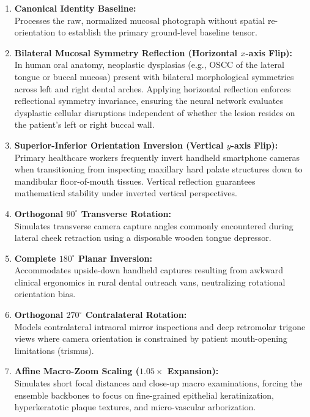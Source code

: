 \documentclass[12pt,a4paper,oneside]{report}
\begin{document}
\begin{enumerate}[label=\textbf{Pass \arabic*:}, leftmargin=*]
    \item \textbf{Canonical Identity Baseline:} \\
    Processes the raw, normalized mucosal photograph without spatial re-orientation to establish the primary ground-level baseline tensor.
    
    \item \textbf{Bilateral Mucosal Symmetry Reflection (Horizontal $x$-axis Flip):} \\
    In human oral anatomy, neoplastic dysplasias (e.g., OSCC of the lateral tongue or buccal mucosa) present with bilateral morphological symmetries across left and right dental arches. Applying horizontal reflection enforces reflectional symmetry invariance, ensuring the neural network evaluates dysplastic cellular disruptions independent of whether the lesion resides on the patient's left or right buccal wall.
    
    \item \textbf{Superior-Inferior Orientation Inversion (Vertical $y$-axis Flip):} \\
    Primary healthcare workers frequently invert handheld smartphone cameras when transitioning from inspecting maxillary hard palate structures down to mandibular floor-of-mouth tissues. Vertical reflection guarantees mathematical stability under inverted vertical perspectives.
    
    \item \textbf{Orthogonal $90^\circ$ Transverse Rotation:} \\
    Simulates transverse camera capture angles commonly encountered during lateral cheek retraction using a disposable wooden tongue depressor.
    
    \item \textbf{Complete $180^\circ$ Planar Inversion:} \\
    Accommodates upside-down handheld captures resulting from awkward clinical ergonomics in rural dental outreach vans, neutralizing rotational orientation bias.
    
    \item \textbf{Orthogonal $270^\circ$ Contralateral Rotation:} \\
    Models contralateral intraoral mirror inspections and deep retromolar trigone views where camera orientation is constrained by patient mouth-opening limitations (trismus).
    
    \item \textbf{Affine Macro-Zoom Scaling ($1.05\times$ Expansion):} \\
    Simulates short focal distances and close-up macro examinations, forcing the ensemble backbones to focus on fine-grained epithelial keratinization, hyperkeratotic plaque textures, and micro-vascular arborization.
    

\end{enumerate}
\end{document}
